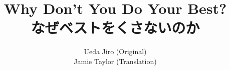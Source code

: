 \documentclass[paper=a4,fontsize=11pt]{report}	 	%
\begin{document}
\begin{CJK}{UTF8}{goth}								%


\renewcommand\rubysep{-0.1ex}

\title{Why Don't You Do Your Best?\\なぜベストをくさないのか}
\author{Ueda Jiro (Original)\\Jamie Taylor (Translation)}
\maketitle




\end{CJK}
\end{document}
